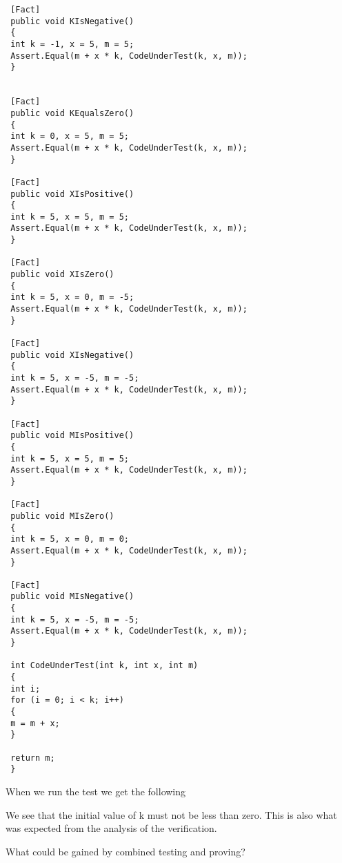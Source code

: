 \begin{enumerate}[label=(\alph*)]
\begin{lstlisting}
 [Fact]
 public void KIsNegative()
 {
 int k = -1, x = 5, m = 5;
 Assert.Equal(m + x * k, CodeUnderTest(k, x, m));
 }
 
 
 [Fact]
 public void KEqualsZero()
 {
 int k = 0, x = 5, m = 5;
 Assert.Equal(m + x * k, CodeUnderTest(k, x, m));
 }
 
 [Fact]
 public void XIsPositive()
 {
 int k = 5, x = 5, m = 5;
 Assert.Equal(m + x * k, CodeUnderTest(k, x, m));
 }
 
 [Fact]
 public void XIsZero()
 {
 int k = 5, x = 0, m = -5;
 Assert.Equal(m + x * k, CodeUnderTest(k, x, m));
 }
 
 [Fact]
 public void XIsNegative()
 {
 int k = 5, x = -5, m = -5;
 Assert.Equal(m + x * k, CodeUnderTest(k, x, m));
 }
 
 [Fact]
 public void MIsPositive()
 {
 int k = 5, x = 5, m = 5;
 Assert.Equal(m + x * k, CodeUnderTest(k, x, m));
 }
 
 [Fact]
 public void MIsZero()
 {
 int k = 5, x = 0, m = 0;
 Assert.Equal(m + x * k, CodeUnderTest(k, x, m));
 }
 
 [Fact]
 public void MIsNegative()
 {
 int k = 5, x = -5, m = -5;
 Assert.Equal(m + x * k, CodeUnderTest(k, x, m));
 }
 
 int CodeUnderTest(int k, int x, int m)
 {
 int i;
 for (i = 0; i < k; i++)
 {
 m = m + x;
 }
 
 return m;
 }
\end{lstlisting}

When we run the test we get the following

We see that the initial value of k must not be less than zero. This is also what was expected from the analysis of the verification.
\end{enumerate}

\item What could be gained by combined testing and proving?


